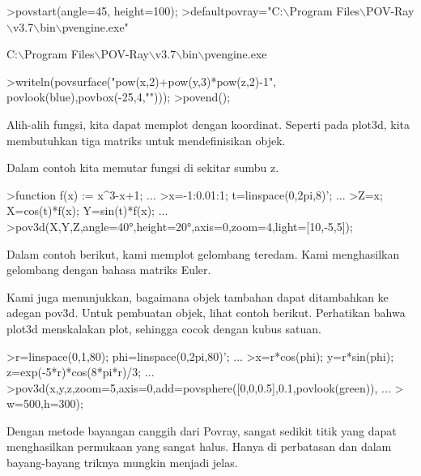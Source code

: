 \documentclass[a4paper,10pt]{article}
\begin{document}
\begin{eulernotebook}
\begin{eulerprompt}
>povstart(angle=45, height=100);
>defaultpovray="C:\(\backslash\)Program Files\(\backslash\)POV-Ray\(\backslash\)v3.7\(\backslash\)bin\(\backslash\)pvengine.exe"
\end{eulerprompt}
\begin{euleroutput}
  C:\(\backslash\)Program Files\(\backslash\)POV-Ray\(\backslash\)v3.7\(\backslash\)bin\(\backslash\)pvengine.exe
\end{euleroutput}
\begin{eulerprompt}
>writeln(povsurface("pow(x,2)+pow(y,3)*pow(z,2)-1", povlook(blue),povbox(-25,4,""))); 
>povend(); 
\end{eulerprompt}
\begin{eulercomment}
Alih-alih fungsi, kita dapat memplot dengan koordinat. Seperti pada
plot3d, kita membutuhkan tiga matriks untuk mendefinisikan objek.

Dalam contoh kita memutar fungsi di sekitar sumbu z.
\end{eulercomment}
\begin{eulerprompt}
>function f(x) := x^3-x+1; ...
>x=-1:0.01:1; t=linspace(0,2pi,8)'; ...
>Z=x; X=cos(t)*f(x); Y=sin(t)*f(x); ...
>pov3d(X,Y,Z,angle=40°,height=20°,axis=0,zoom=4,light=[10,-5,5]);
\end{eulerprompt}
\begin{eulercomment}
Dalam contoh berikut, kami memplot gelombang teredam. Kami
menghasilkan gelombang dengan bahasa matriks Euler.

Kami juga menunjukkan, bagaimana objek tambahan dapat ditambahkan ke
adegan pov3d. Untuk pembuatan objek, lihat contoh berikut. Perhatikan
bahwa plot3d menskalakan plot, sehingga cocok dengan kubus satuan.
\end{eulercomment}
\begin{eulerprompt}
>r=linspace(0,1,80); phi=linspace(0,2pi,80)'; ...
>x=r*cos(phi); y=r*sin(phi); z=exp(-5*r)*cos(8*pi*r)/3;  ...
>pov3d(x,y,z,zoom=5,axis=0,add=povsphere([0,0,0.5],0.1,povlook(green)), ...
>  w=500,h=300);
\end{eulerprompt}
\begin{eulercomment}
Dengan metode bayangan canggih dari Povray, sangat sedikit titik yang
dapat menghasilkan permukaan yang sangat halus. Hanya di perbatasan
dan dalam bayang-bayang triknya mungkin menjadi jelas.


\end{eulercomment}
\end{eulernotebook}
\end{document}
